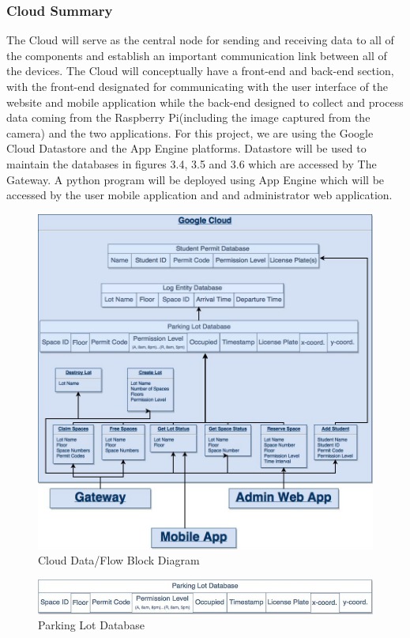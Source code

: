 \documentclass[paper=a4, fontsize=12pt]{scrartcl}
\numberwithin{equation}{section}		%
\numberwithin{figure}{section}			%
\numberwithin{table}{section}				%
\begin{document}
\subsubsection{Cloud Summary}
The Cloud will serve as the central node for sending and receiving data to all of the components and establish an important communication link between all of the devices. The Cloud will conceptually have a front-end and back-end section, with the front-end designated for communicating with the user interface of the website and mobile application while the back-end designed to collect and process data coming from the Raspberry Pi(including the image captured from the camera) and the two applications. For this project, we are using the Google Cloud Datastore and the App Engine platforms. Datastore will be used to maintain the databases in figures 3.4, 3.5 and 3.6 which are accessed by The Gateway. A python program will be deployed using App Engine which will be accessed by the user mobile application and and administrator web application.
\begin{figure}[H]
\hbox{\hspace{-1.0cm}\includegraphics[width=7in]{Cloud_Block_Diagram.jpg}}
\caption{Cloud Data/Flow Block Diagram}
\end{figure}
\begin{figure}[H]
\centering
\includegraphics[width=6in]{Structure_DB.png}
\caption{Parking Lot Database}
\end{figure}
\end{document}
